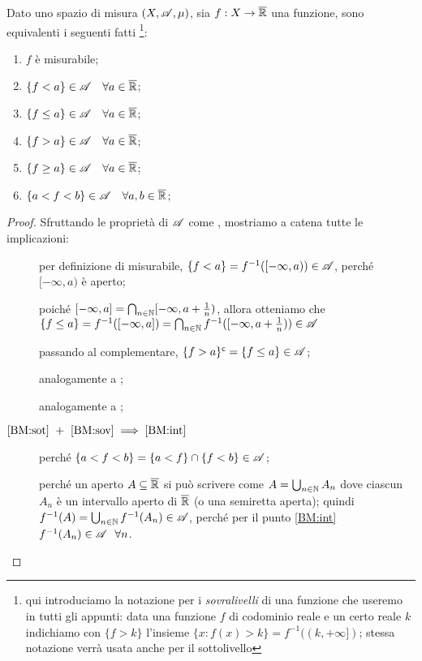 \begin{proposition}
	\label{BasicMis}
	Dato uno spazio di misura $(X,\mathscr A,\mu)$, sia $f:X\rightarrow \overline{\mathbb R}$ una funzione, sono equivalenti i seguenti fatti
	\footnote{qui introduciamo la notazione per i \textit{sovralivelli} di una funzione che useremo in tutti gli appunti:
		data una funzione $f$ di codominio reale e un certo reale $k$ indichiamo con $\{f>k\}$ l'insieme
		$\{x:f(x)>k\}=f^{-1}((k,+\infty])$; stessa notazione verrà usata anche per il sottolivello}:
	\begin{enumerate}[label=(\arabic*),ref=(\arabic*)]
		\item $f$ è misurabile; \label{BM:mis}
		\item $\{f<a\}\in \mathscr A \quad \forall a\in \overline{\mathbb R}$; \label{BM:sot}
		\item $\{f\leq a\}\in \mathscr A \quad \forall a\in \overline{\mathbb R}$; \label{BM:soteq}
		\item $\{f>a\}\in \mathscr A \quad \forall a\in \overline{\mathbb R}$; \label{BM:sov}
		\item $\{f\geq a\}\in \mathscr A \quad \forall a\in \overline{\mathbb R}$;  \label{BM:soveq}
		\item $\{a<f<b\}\in \mathscr A \quad \forall a,b\in \overline{\mathbb R}$; \label{BM:int}
	\end{enumerate}
\end{proposition}
\begin{proof}
	Sfruttando le proprietà di $\mathscr A$ come \sigalg, mostriamo a catena tutte le implicazioni:
	\begin{description}
	\item[] per definizione di misurabile, $\{f<a\}=f^{-1}([-\infty,a))\in \mathscr A$,
		perché $[-\infty,a)$ è aperto;
	\item[] poiché $[-\infty,a]=\bigcap_{n\in \mathbb N}[-\infty,a+\frac{1}{n})$, allora otteniamo che
		$\{f\leq a\}=f^{-1}([-\infty,a])=\bigcap_{n\in \mathbb N}f^{-1}([-\infty,a+\frac{1}{n}))\in \mathscr A$
	\item[] passando al complementare, $\{f>a\}^\mathsf{c}=\{f\leq a\}\in \mathscr A$;
	\item[] analogamente a ; 
	\item[] analogamente a ;
	\item[$\text{\ref{BM:sot}}\ +\ \text{\ref{BM:sov}}\implies\text{\ref{BM:int}}$] perché
		$\{a<f<b\}=\{a<f\}\cap\{f<b\}\in \mathscr A$;
	\item[] perché un aperto $A\subseteq\overline{\mathbb R}$ si può scrivere come
		$A=\bigcup_{n\in \mathbb N}A_n$ dove ciascun $A_n$ è un intervallo aperto di $\overline{\mathbb R}$ (o una semiretta aperta);
		quindi $f^{-1}(A)=\bigcup_{n\in \mathbb N}f^{-1}(A_n)\in \mathscr A$, perché per il punto \ref{BM:int} $f^{-1}(A_n)\in \mathscr A\ \ \forall n$.
	\end{description}
\end{proof}


